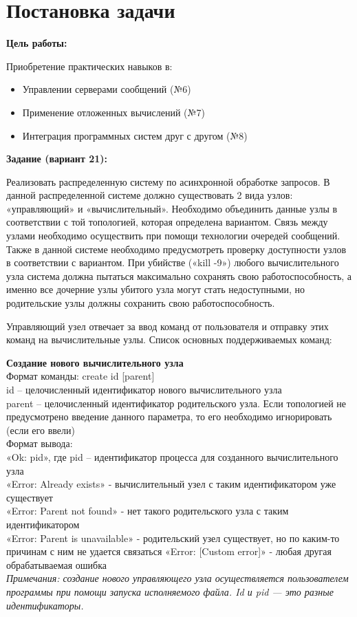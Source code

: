\section{Постановка задачи}

{\bfseries Цель работы:} 

Приобретение практических навыков в:

\begin{itemize}
    \item Управлении серверами сообщений (№6)
    \item Применение отложенных вычислений (№7)
    \item Интеграция программных систем друг с другом (№8)
\end{itemize}

{\bfseries Задание (вариант 21):} 

Реализовать распределенную систему по асинхронной обработке запросов. В данной
распределенной системе должно существовать 2 вида узлов: «управляющий» и
«вычислительный». Необходимо объединить данные узлы в соответствии с той топологией,
которая определена вариантом. Связь между узлами необходимо осуществить при помощи
технологии очередей сообщений. Также в данной системе необходимо предусмотреть проверку
доступности узлов в соответствии с вариантом. При убийстве («kill -9») любого вычислительного
узла система должна пытаться максимально сохранять свою работоспособность, а именно все
дочерние узлы убитого узла могут стать недоступными, но родительские узлы должны сохранить
свою работоспособность.

Управляющий узел отвечает за ввод команд от пользователя и отправку этих команд на
вычислительные узлы. Список основных поддерживаемых команд:

\textbf{Создание нового вычислительного узла}\\
Формат команды: create id [parent]\\
id – целочисленный идентификатор нового вычислительного узла\\
parent – целочисленный идентификатор родительского узла. Если топологией не предусмотрено
введение данного параметра, то его необходимо игнорировать (если его ввели)\\
Формат вывода:\\
«Ok: pid», где pid – идентификатор процесса для созданного вычислительного узла\\
«Error: Already exists» - вычислительный узел с таким идентификатором уже существует\\
«Error: Parent not found» - нет такого родительского узла с таким идентификатором\\
«Error: Parent is unavailable» - родительский узел существует, но по каким-то причинам с ним не
удается связаться
«Error: [Custom error]» - любая другая обрабатываемая ошибка\\
\textit{Примечания: создание нового управляющего узла осуществляется пользователем программы
при помощи запуска исполняемого файла. Id и pid — это разные идентификаторы.
}\\


